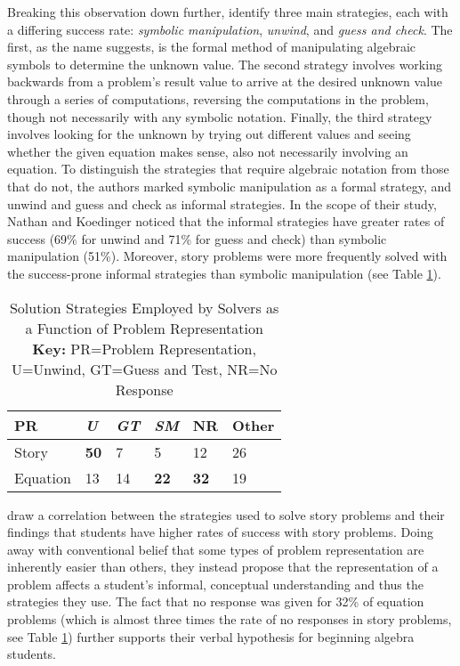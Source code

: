\documentclass[10pt,letterpaper]{article}
\begin{document}
Breaking this observation down further,  identify three main strategies, each with a differing success rate: \textit{symbolic manipulation}, \textit{unwind}, and \textit{guess and check}. The first, as the name suggests, is the formal method of manipulating algebraic symbols to determine the unknown value. The second strategy involves working backwards from a problem's result value to arrive at the desired unknown value through a series of computations, reversing the computations in the problem, though not necessarily with any symbolic notation. Finally, the third strategy involves looking for the unknown by trying out different values and seeing whether the given equation makes sense, also not necessarily involving an equation. To distinguish the strategies that require algebraic notation from those that do not, the authors marked symbolic manipulation as a formal strategy, and unwind and guess and check as informal strategies. In the scope of their study, Nathan and Koedinger noticed that the informal strategies have greater rates of success (69\% for unwind and 71\% for guess and check) than symbolic manipulation (51\%). Moreover, story problems were more frequently solved with the success-prone informal strategies than symbolic manipulation (see Table \ref{strategies_employed}). 
\begin{table}[!ht]
\begin{center} 
\caption{Solution Strategies Employed by Solvers as a Function of Problem Representation \cite{KoedNath2004}\\ \textbf{Key:} PR=Problem Representation, U=Unwind, GT=Guess and Test, NR=No Response} 
\label{strategies_employed} 
\vskip 0.12in
\begin{tabular}{llllll} 
\hline
PR    &  \textit{U} & \textit{GT} & \textit{SM} & NR & Other \\
\hline
Story        &   \textbf{50} & 7 & 5 & 12 & 26\\
Equation   &   13 & 14 & \textbf{22} & \textbf{32} & 19 \\
\hline
\end{tabular} 
\end{center} 
\end{table}

 draw a correlation between the strategies used to solve story problems and their findings that students have higher rates of success with story problems. Doing away with conventional belief that some types of problem representation are inherently easier than others, they instead propose that the representation of a problem affects a student's informal, conceptual understanding and thus the strategies they use. The fact that no response was given for 32\% of equation problems (which is almost three times the rate of no responses in story problems, see Table \ref{strategies_employed}) further supports their verbal hypothesis for beginning algebra students.
\end{document}
